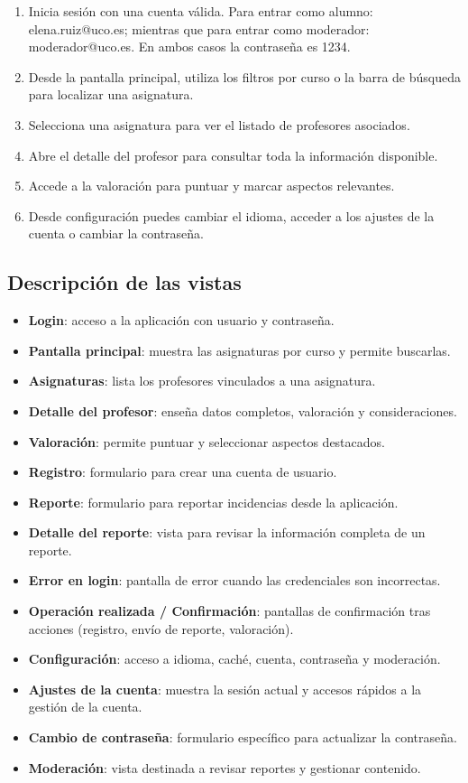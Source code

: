\documentclass[12pt,oneside]{book}
\begin{document}
\begin{enumerate}
    \item Inicia sesión con una cuenta válida. Para entrar como alumno: elena.ruiz@uco.es; mientras que para entrar como moderador: moderador@uco.es. En ambos casos la contraseña es 1234.
    \item Desde la pantalla principal, utiliza los filtros por curso o la barra de búsqueda para localizar una asignatura.
    \item Selecciona una asignatura para ver el listado de profesores asociados.
    \item Abre el detalle del profesor para consultar toda la información disponible.
    \item Accede a la valoración para puntuar y marcar aspectos relevantes.
    \item Desde configuración puedes cambiar el idioma, acceder a los ajustes de la cuenta o cambiar la contraseña.
\end{enumerate}

\newpage
\subsection{Descripción de las vistas}

\begin{itemize}
    \item \textbf{Login}: acceso a la aplicación con usuario y contraseña.
    \item \textbf{Pantalla principal}: muestra las asignaturas por curso y permite buscarlas.
    \item \textbf{Asignaturas}: lista los profesores vinculados a una asignatura.
    \item \textbf{Detalle del profesor}: enseña datos completos, valoración y consideraciones.
    \item \textbf{Valoración}: permite puntuar y seleccionar aspectos destacados.
    \item \textbf{Registro}: formulario para crear una cuenta de usuario.
    \item \textbf{Reporte}: formulario para reportar incidencias desde la aplicación.
    \item \textbf{Detalle del reporte}: vista para revisar la información completa de un reporte.
    \item \textbf{Error en login}: pantalla de error cuando las credenciales son incorrectas.
    \item \textbf{Operación realizada / Confirmación}: pantallas de confirmación tras acciones (registro, envío de reporte, valoración).
    \item \textbf{Configuración}: acceso a idioma, caché, cuenta, contraseña y moderación.
    \item \textbf{Ajustes de la cuenta}: muestra la sesión actual y accesos rápidos a la gestión de la cuenta.
    \item \textbf{Cambio de contraseña}: formulario específico para actualizar la contraseña.
    \item \textbf{Moderación}: vista destinada a revisar reportes y gestionar contenido.
\end{itemize}
\end{document}
